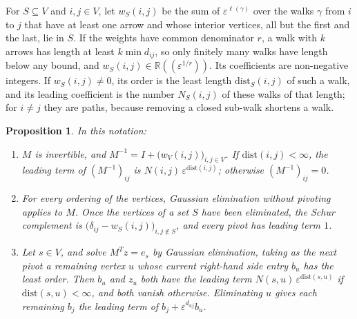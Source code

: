 \documentclass[12pt, a4paper]{report}
\theoremstyle{plain}
\newtheorem{proposition}[theorem]{Proposition}
\theoremstyle{definition}
\theoremstyle{remark}
\theoremstyle{plain}
\newcommand{\RR}{\mathbb{R}}
\begin{document}
For $S\subseteq V$ and $i,j\in V$, let $w_S(i,j)$ be the sum of $\varepsilon^{\ell(\gamma)}$ over the walks $\gamma$ from $i$ to $j$ that have at least one arrow and whose interior vertices, all but the first and the last, lie in $S$. If the weights have common denominator $r$, a walk with $k$ arrows has length at least $k\min d_{ij}$, so only finitely many walks have length below any bound, and $w_S(i,j)\in\RR((\varepsilon^{1/r}))$. Its coefficients are non-negative integers. If $w_S(i,j)\neq0$, its order is the least length $\mathrm{dist}_S(i,j)$ of such a walk, and its leading coefficient is the number $N_S(i,j)$ of these walks of that length; for $i\neq j$ they are paths, because removing a closed sub-walk shortens a walk.

\begin{proposition}\label{prop:dijkstra}
In this notation:
\begin{enumerate}
  \item $M$ is invertible, and $M^{-1}=I+\bigl(w_V(i,j)\bigr)_{i,j\in V}$. If $\mathrm{dist}(i,j)<\infty$, the leading term of $(M^{-1})_{ij}$ is $N(i,j)\,\varepsilon^{\mathrm{dist}(i,j)}$; otherwise $(M^{-1})_{ij}=0$.
  \item For every ordering of the vertices, Gaussian elimination without pivoting applies to $M$. Once the vertices of a set $S$ have been eliminated, the Schur complement is $\bigl(\delta_{ij}-w_S(i,j)\bigr)_{i,j\notin S}$, and every pivot has leading term $1$.
  \item Let $s\in V$, and solve $M^Tz=e_s$ by Gaussian elimination, taking as the next pivot a remaining vertex $u$ whose current right-hand side entry $b_u$ has the least order. Then $b_u$ and $z_u$ both have the leading term $N(s,u)\,\varepsilon^{\mathrm{dist}(s,u)}$ if $\mathrm{dist}(s,u)<\infty$, and both vanish otherwise. Eliminating $u$ gives each remaining $b_j$ the leading term of $b_j+\varepsilon^{d_{uj}}b_u$.
\end{enumerate}
\end{proposition}
\end{document}
